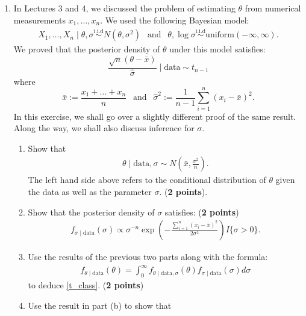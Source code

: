 \documentclass{scrartcl}
\begin{document}
\begin{enumerate}
\item In Lectures 3 and 4, we discussed the problem of estimating
  $\theta$ from numerical measurements $x_1, \dots, x_n$. We used the
  following Bayesian model:
  \begin{align*}
    X_1, \dots, X_n \mid \theta, \sigma \overset{\text{i.i.d}}{\sim}
    N(\theta, \sigma^2)  ~~ \text{ and } ~~ \theta, \log \sigma
    \overset{\text{i.i.d}}{\sim} \text{uniform}(-\infty, \infty).
  \end{align*}
  We proved that the posterior density of $\theta$ under this model
  satisfies:
  \begin{equation}\label{t_class}
    \frac{\sqrt{n} \left(\theta - \bar{x} \right)}{\hat{\sigma}} \mid
    \text{data} \sim t_{n-1}
  \end{equation}
  where
  \begin{equation*}
    \bar{x} := \frac{x_1 + \dots + x_n}{n} ~~ \text{ and } ~~
    \hat{\sigma}^2 := \frac{1}{n-1} \sum_{i=1}^n (x_i - \bar{x})^2. 
  \end{equation*}
  In this exercise, we shall go over a slightly different proof of the
  same result. Along the way, we shall also discuss inference for
  $\sigma$.
  \begin{enumerate}
  \item Show that
    \begin{align*}
      \theta \mid \text{data}, \sigma \sim N(\bar{x},
      \frac{\sigma^2}{n}). 
    \end{align*}
    The left hand side above refers to the conditional distribution of
    $\theta$ given the data as well as the parameter
    $\sigma$. (\textbf{2 points}).
  \item Show that the posterior density of $\sigma$ satisfies:
    (\textbf{2 points})
    \begin{align*}
   f_{\sigma \mid \text{data}}(\sigma) \propto   \sigma^{-n} \exp \left(-\frac{\sum_{i=1}^n (x_i -
      \bar{x})^2}{2 \sigma^2} \right) I\{\sigma > 0\}. 
    \end{align*}
  \item Use the results of the previous two parts along with the
    formula:
    \begin{align*}
      f_{\theta \mid \text{data}}(\theta) = \int_0^{\infty} f_{\theta
      \mid \text{data}, \sigma}(\theta) f_{\sigma \mid
      \text{data}}(\sigma) d\sigma
    \end{align*}
    to deduce \eqref{t_class}. (\textbf{2 points})
  \item Use the result in part (b) to show that

\end{enumerate}
\end{enumerate}
\end{document}
